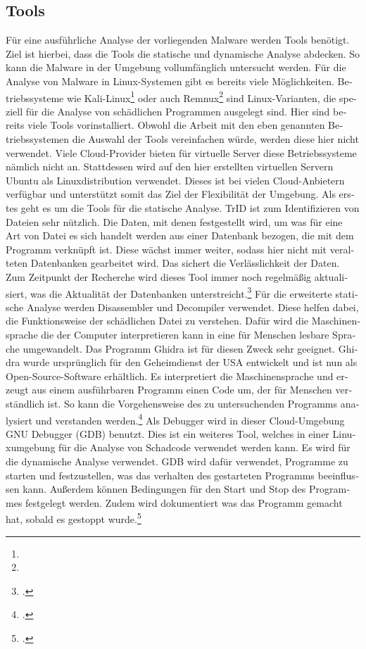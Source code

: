 \begin{otherlanguage}{ngerman}
\subsection{Tools}
Für eine ausführliche Analyse der vorliegenden Malware werden Tools benötigt. Ziel ist hierbei, dass die Tools die statische und dynamische Analyse abdecken. So kann die Malware in der Umgebung vollumfänglich untersucht werden. Für die Analyse von Malware in Linux-Systemen gibt es bereits viele Möglichkeiten. Betriebssysteme wie \dq Kali-Linux\footnote{} \dq{} oder auch \dq Remnux\footnote{} \dq{} sind Linux-Varianten, die speziell für die Analyse von schädlichen Programmen ausgelegt sind. Hier sind bereits viele Tools vorinstalliert. Obwohl die Arbeit mit den eben genannten Betriebssystemen die Auswahl der Tools vereinfachen würde, werden diese hier nicht verwendet. Viele Cloud-Provider bieten für virtuelle Server diese Betriebssysteme nämlich nicht an. Stattdessen wird auf den hier erstellten virtuellen Servern Ubuntu als Linuxdistribution verwendet. Dieses ist bei vielen Cloud-Anbietern verfügbar und unterstützt somit das Ziel der Flexibilität der Umgebung. 
\newline
Als erstes geht es um die Tools für die statische Analyse. \dq TrID \dq{} ist zum Identifizieren von Dateien sehr nützlich. Die Daten, mit denen festgestellt wird, um was für eine Art von Datei es sich handelt werden aus einer Datenbank bezogen, die mit dem Programm verknüpft ist. Diese wächst immer weiter, sodass hier nicht mit veralteten Datenbanken gearbeitet wird. Das sichert die Verlässlichkeit der Daten. Zum Zeitpunkt der Recherche wird dieses Tool immer noch regelmäßig aktualisiert, was die Aktualität der Datenbanken unterstreicht.\footcite{TrID} 
\newline 
Für die erweiterte statische Analyse werden Disassembler und Decompiler verwendet. Diese helfen dabei, die Funktionsweise der schädlichen Datei zu verstehen. Dafür wird die Maschinensprache die der Computer interpretieren kann in eine für Menschen lesbare Sprache umgewandelt. Das Programm \dq Ghidra \dq{} ist für diesen Zweck sehr geeignet. Ghidra wurde ursprünglich für den Geheimdienst der USA entwickelt und ist nun als Open-Source-Software erhältlich. Es interpretiert die Maschinensprache und erzeugt aus einem ausführbaren Programm einen Code um, der für Menschen verständlich ist. So kann die Vorgehensweise des zu untersuchenden Programms analysiert und verstanden werden.\footcite{}
\newline
Als Debugger wird in dieser Cloud-Umgebung \dq GNU Debugger (GDB) \dq{} benutzt. Dies ist ein weiteres Tool, welches in einer Linuxumgebung für die Analyse von Schadcode verwendet werden kann. Es wird für die dynamische Analyse verwendet. \dq GDB \dq{} wird dafür verwendet, Programme zu starten und festzustellen, was das verhalten des gestarteten Programms beeinflussen kann. Außerdem können Bedingungen für den Start und Stop des Programmes festgelegt werden. Zudem wird dokumentiert was das Programm gemacht hat, sobald es gestoppt wurde.\footcite{}
\newline



\end{otherlanguage}
